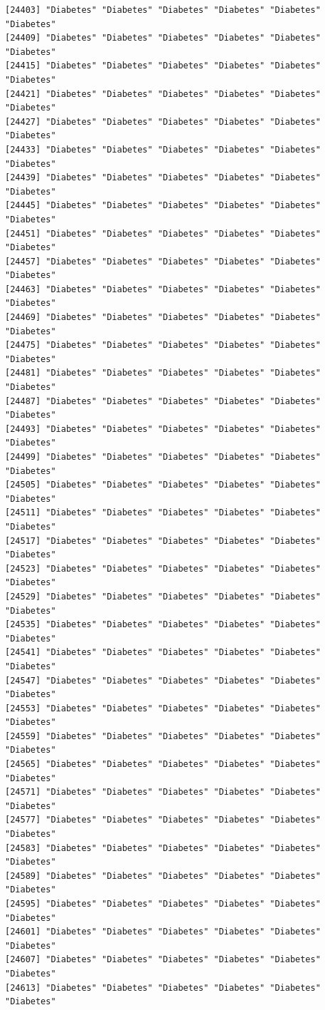 \documentclass[
  letterpaper,
  DIV=11,
  numbers=noendperiod]{scrartcl}
\begin{document}
\begin{verbatim}
[24403] "Diabetes" "Diabetes" "Diabetes" "Diabetes" "Diabetes" "Diabetes"
[24409] "Diabetes" "Diabetes" "Diabetes" "Diabetes" "Diabetes" "Diabetes"
[24415] "Diabetes" "Diabetes" "Diabetes" "Diabetes" "Diabetes" "Diabetes"
[24421] "Diabetes" "Diabetes" "Diabetes" "Diabetes" "Diabetes" "Diabetes"
[24427] "Diabetes" "Diabetes" "Diabetes" "Diabetes" "Diabetes" "Diabetes"
[24433] "Diabetes" "Diabetes" "Diabetes" "Diabetes" "Diabetes" "Diabetes"
[24439] "Diabetes" "Diabetes" "Diabetes" "Diabetes" "Diabetes" "Diabetes"
[24445] "Diabetes" "Diabetes" "Diabetes" "Diabetes" "Diabetes" "Diabetes"
[24451] "Diabetes" "Diabetes" "Diabetes" "Diabetes" "Diabetes" "Diabetes"
[24457] "Diabetes" "Diabetes" "Diabetes" "Diabetes" "Diabetes" "Diabetes"
[24463] "Diabetes" "Diabetes" "Diabetes" "Diabetes" "Diabetes" "Diabetes"
[24469] "Diabetes" "Diabetes" "Diabetes" "Diabetes" "Diabetes" "Diabetes"
[24475] "Diabetes" "Diabetes" "Diabetes" "Diabetes" "Diabetes" "Diabetes"
[24481] "Diabetes" "Diabetes" "Diabetes" "Diabetes" "Diabetes" "Diabetes"
[24487] "Diabetes" "Diabetes" "Diabetes" "Diabetes" "Diabetes" "Diabetes"
[24493] "Diabetes" "Diabetes" "Diabetes" "Diabetes" "Diabetes" "Diabetes"
[24499] "Diabetes" "Diabetes" "Diabetes" "Diabetes" "Diabetes" "Diabetes"
[24505] "Diabetes" "Diabetes" "Diabetes" "Diabetes" "Diabetes" "Diabetes"
[24511] "Diabetes" "Diabetes" "Diabetes" "Diabetes" "Diabetes" "Diabetes"
[24517] "Diabetes" "Diabetes" "Diabetes" "Diabetes" "Diabetes" "Diabetes"
[24523] "Diabetes" "Diabetes" "Diabetes" "Diabetes" "Diabetes" "Diabetes"
[24529] "Diabetes" "Diabetes" "Diabetes" "Diabetes" "Diabetes" "Diabetes"
[24535] "Diabetes" "Diabetes" "Diabetes" "Diabetes" "Diabetes" "Diabetes"
[24541] "Diabetes" "Diabetes" "Diabetes" "Diabetes" "Diabetes" "Diabetes"
[24547] "Diabetes" "Diabetes" "Diabetes" "Diabetes" "Diabetes" "Diabetes"
[24553] "Diabetes" "Diabetes" "Diabetes" "Diabetes" "Diabetes" "Diabetes"
[24559] "Diabetes" "Diabetes" "Diabetes" "Diabetes" "Diabetes" "Diabetes"
[24565] "Diabetes" "Diabetes" "Diabetes" "Diabetes" "Diabetes" "Diabetes"
[24571] "Diabetes" "Diabetes" "Diabetes" "Diabetes" "Diabetes" "Diabetes"
[24577] "Diabetes" "Diabetes" "Diabetes" "Diabetes" "Diabetes" "Diabetes"
[24583] "Diabetes" "Diabetes" "Diabetes" "Diabetes" "Diabetes" "Diabetes"
[24589] "Diabetes" "Diabetes" "Diabetes" "Diabetes" "Diabetes" "Diabetes"
[24595] "Diabetes" "Diabetes" "Diabetes" "Diabetes" "Diabetes" "Diabetes"
[24601] "Diabetes" "Diabetes" "Diabetes" "Diabetes" "Diabetes" "Diabetes"
[24607] "Diabetes" "Diabetes" "Diabetes" "Diabetes" "Diabetes" "Diabetes"
[24613] "Diabetes" "Diabetes" "Diabetes" "Diabetes" "Diabetes" "Diabetes"

\end{verbatim}
\end{document}
